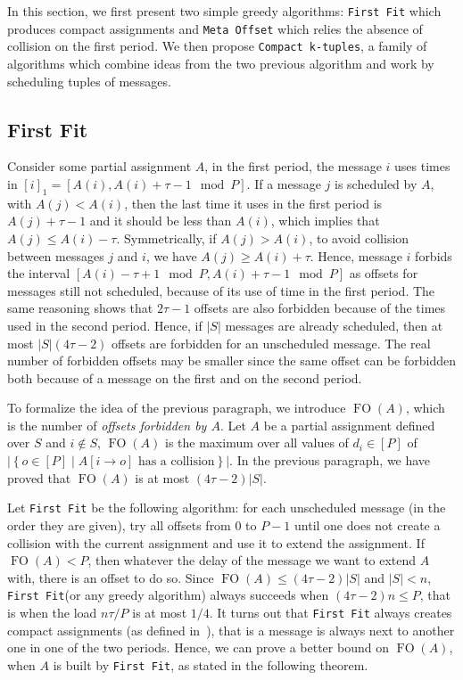 \documentclass[a4paper,UKenglish,cleveref, autoref, thm-restate]{lipics-v2019}
\DeclareMathOperator{\Fo}{FO}
\newcommand\firstfit{\texttt{First Fit}\xspace}
\newcommand\metaoffset{\texttt{Meta Offset}\xspace}
\begin{document}
 In this section, we first present two simple greedy algorithms:
 \firstfit which produces compact assignments and \metaoffset which 
 relies the absence of collision on the first period. We then propose \texttt{Compact k-tuples}, a family of algorithms which combine ideas from the two previous algorithm and work by scheduling tuples of messages.

\subsection{First Fit}

Consider some partial assignment $A$, in the first period, the message $i$ uses times in $[i]_1 = [A(i), A(i) + \tau -1 \mod P]$. If a message $j$ is scheduled by $A$, with $A(j) < A(i)$, then the last time it uses in the first period is $A(j)+\tau-1$ and it should be less than $A(i)$, which implies that $A(j) \leq A(i) - \tau$. Symmetrically, if $A(j) > A(i)$, to avoid collision between messages $j$ and $i$, we have $A(j) \geq A(i) + \tau$. Hence, message $i$ forbids the interval $[A(i) - \tau +1 \mod P, A(i) + \tau -1 \mod P]$ as offsets for messages still not scheduled, because of its use of time in the first period. The same reasoning shows that $2\tau -1$ offsets are also forbidden because of the times used in the second period. Hence, if $|S|$ messages are already scheduled, then at most $|S|(4\tau -2)$ offsets are forbidden for an unscheduled message. The real number of forbidden offsets may be smaller since the same offset can be forbidden both because of a message on the first and on the second period.

To formalize the idea of the previous paragraph, we introduce $\Fo(A)$, which is the number of \emph{offsets forbidden by $A$}. Let $A$ be a partial assignment defined over $S$ and $i\notin S$, $\Fo(A)$ is the maximum over all values of $d_i \in [P]$ of $|\left\{ o \in [P] \mid A[i \rightarrow o] \text{ has a collision}\right\}|$. In the previous paragraph, we have proved that $\Fo(A)$ is at most $(4 \tau -2)|S|$. 

Let \firstfit be the following algorithm:  for each unscheduled message (in the order they are given), try all offsets from $0$ to $P-1$ until one does not create a collision with the current assignment and use it to extend the assignment. If $\Fo(A) < P$, then whatever the delay of the message we want to extend $A$ with, there is an offset to do so. Since $\Fo(A) \leq (4 \tau -2)|S|$ and $|S| < n$, \firstfit (or any greedy algorithm) always succeeds when $(4 \tau -2)n \leq P$, that is when the load $ n\tau /P$ is at most $1/4$.
It turns out that \firstfit always creates compact assignments (as defined in~\cite{bartharxiv2018deterministic}), that is a message is always next to another one in one of the two periods. Hence, we can prove a better bound on $\Fo(A)$, when $A$ is built by \firstfit, as stated in the following theorem.
\end{document}
